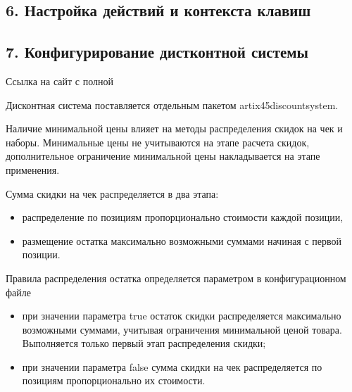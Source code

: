\documentclass[letterpaper,10pt,russian]{sphinxmanual}
\begin{document}
\subsection{6. Настройка действий и контекста клавиш}
\label{\detokenize{additional:id6}}
\begin{figure}[htbp]
\centering

\noindent{}
\end{figure}


\subsection{7. Конфигурирование дистконтной системы}
\label{\detokenize{additional:id7}}
\sphinxAtStartPar
Ссылка на сайт с полной 

\sphinxAtStartPar
Дисконтная система поставляется отдельным пакетом artix45\sphinxhyphen{}discountsystem.

\sphinxAtStartPar
Наличие минимальной цены влияет на методы распределения скидок на чек и наборы.
Минимальные цены не учитываются на этапе расчета скидок, дополнительное ограничение минимальной цены накладывается на этапе применения.

\sphinxAtStartPar
Сумма скидки на чек распределяется в два этапа:
\begin{itemize}
\item {} 
\sphinxAtStartPar
распределение по позициям пропорционально стоимости каждой позиции,

\item {} 
\sphinxAtStartPar
размещение остатка максимально возможными суммами начиная с первой позиции.

\end{itemize}

\sphinxAtStartPar
Правила распределения остатка определяется параметром  в конфигурационном файле 
\begin{itemize}
\item {} 
\sphinxAtStartPar
при значении параметра true остаток скидки распределяется максимально возможными суммами, учитывая ограничения минимальной ценой товара. Выполняется только первый этап распределения скидки;

\item {} 
\sphinxAtStartPar
при значении параметра false сумма скидки на чек распределяется по позициям пропорционально их стоимости.

\end{itemize}
\end{document}
